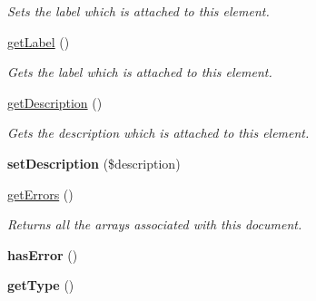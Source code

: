 \begin{DoxyCompactItemize}
\begin{DoxyCompactList}\small\item\em Sets the label which is attached to this element. \item\end{DoxyCompactList}\item 
\hypertarget{class_element_ac7f084bbc6d5db8847efc188309313c6}{
\hyperlink{class_element_ac7f084bbc6d5db8847efc188309313c6}{getLabel} ()}
\label{class_element_ac7f084bbc6d5db8847efc188309313c6}

\begin{DoxyCompactList}\small\item\em Gets the label which is attached to this element. \item\end{DoxyCompactList}\item 
\hyperlink{class_element_a8616349572a72d4cec06480bea8554f7}{getDescription} ()
\begin{DoxyCompactList}\small\item\em Gets the description which is attached to this element. \item\end{DoxyCompactList}\item 
\hypertarget{class_element_a92cf310900257f69e8260e702f1348df}{
{\bfseries setDescription} (\$description)}
\label{class_element_a92cf310900257f69e8260e702f1348df}

\item 
\hypertarget{class_element_a71954b62adbbf8d3c5db87a0a3d341c1}{
\hyperlink{class_element_a71954b62adbbf8d3c5db87a0a3d341c1}{getErrors} ()}
\label{class_element_a71954b62adbbf8d3c5db87a0a3d341c1}

\begin{DoxyCompactList}\small\item\em Returns all the arrays associated with this document. \item\end{DoxyCompactList}\item 
\hypertarget{class_element_a17b3b87bbda05594a7fc1e3bb56a6b14}{
{\bfseries hasError} ()}
\label{class_element_a17b3b87bbda05594a7fc1e3bb56a6b14}

\item 
\hypertarget{class_element_ab7bd9e1e56342d34bcc07931d1724a63}{
{\bfseries getType} ()}
\label{class_element_ab7bd9e1e56342d34bcc07931d1724a63}


\end{DoxyCompactItemize}
